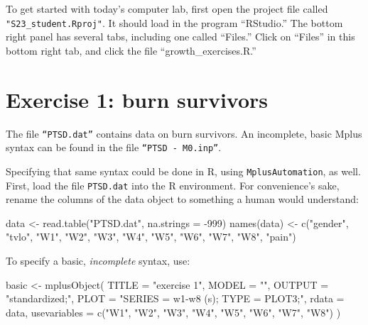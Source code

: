 \documentclass[
]{book}
\newenvironment{Shaded}{\begin{snugshade}}{\end{snugshade}}
\newcommand{\AttributeTok}[1]{\textcolor[rgb]{0.77,0.63,0.00}{#1}}
\newcommand{\DecValTok}[1]{\textcolor[rgb]{0.00,0.00,0.81}{#1}}
\newcommand{\FunctionTok}[1]{\textcolor[rgb]{0.00,0.00,0.00}{#1}}
\newcommand{\NormalTok}[1]{#1}
\newcommand{\OtherTok}[1]{\textcolor[rgb]{0.56,0.35,0.01}{#1}}
\newcommand{\SpecialCharTok}[1]{\textcolor[rgb]{0.00,0.00,0.00}{#1}}
\newcommand{\StringTok}[1]{\textcolor[rgb]{0.31,0.60,0.02}{#1}}
\begin{document}
To get started with today's computer lab, first open the project file called \texttt{"S23\_student.Rproj"}. It should load in the program ``RStudio.'' The bottom right panel has several tabs, including one called ``Files.'' Click on ``Files'' in this bottom right tab, and click the file ``growth\_exercises.R.''

\hypertarget{exercise-1-burn-survivors}{%
\section{Exercise 1: burn survivors}\label{exercise-1-burn-survivors}}

The file \texttt{“PTSD.dat”} contains data on burn survivors.
An incomplete, basic Mplus syntax can be found in the file
\texttt{“PTSD\ -\ M0.inp”}.

Specifying that same syntax could be done in R, using \texttt{MplusAutomation}, as well.
First, load the file \texttt{PTSD.dat} into the R environment.
For convenience's sake, rename the columns of the data object to something a human would understand:

\begin{Shaded}
\begin{Highlighting}[]
\NormalTok{data }\OtherTok{\textless{}{-}} \FunctionTok{read.table}\NormalTok{(}\StringTok{"PTSD.dat"}\NormalTok{, }\AttributeTok{na.strings =} \SpecialCharTok{{-}}\DecValTok{999}\NormalTok{)}
\FunctionTok{names}\NormalTok{(data) }\OtherTok{\textless{}{-}} \FunctionTok{c}\NormalTok{(}\StringTok{"gender"}\NormalTok{, }\StringTok{"tvlo"}\NormalTok{,}
                 \StringTok{"W1"}\NormalTok{, }\StringTok{"W2"}\NormalTok{, }\StringTok{"W3"}\NormalTok{, }\StringTok{"W4"}\NormalTok{, }\StringTok{"W5"}\NormalTok{, }\StringTok{"W6"}\NormalTok{, }\StringTok{"W7"}\NormalTok{, }\StringTok{"W8"}\NormalTok{,}
                 \StringTok{"pain"}\NormalTok{)}
\end{Highlighting}
\end{Shaded}

To specify a basic, \emph{incomplete} syntax, use:

\begin{Shaded}
\begin{Highlighting}[]
\NormalTok{basic }\OtherTok{\textless{}{-}} \FunctionTok{mplusObject}\NormalTok{(}
  \AttributeTok{TITLE =} \StringTok{"exercise 1"}\NormalTok{,}
  \AttributeTok{MODEL =} \StringTok{""}\NormalTok{,}
  \AttributeTok{OUTPUT =} \StringTok{"standardized;"}\NormalTok{,}
  \AttributeTok{PLOT =} \StringTok{"SERIES = w1{-}w8 (s);}
\StringTok{          TYPE = PLOT3;"}\NormalTok{,}
  \AttributeTok{rdata =}\NormalTok{ data,}
  \AttributeTok{usevariables =}
    \FunctionTok{c}\NormalTok{(}\StringTok{"W1"}\NormalTok{, }\StringTok{"W2"}\NormalTok{, }\StringTok{"W3"}\NormalTok{, }\StringTok{"W4"}\NormalTok{, }\StringTok{"W5"}\NormalTok{, }\StringTok{"W6"}\NormalTok{, }\StringTok{"W7"}\NormalTok{, }\StringTok{"W8"}\NormalTok{)}
\NormalTok{)}
\end{Highlighting}
\end{Shaded}
\end{document}
